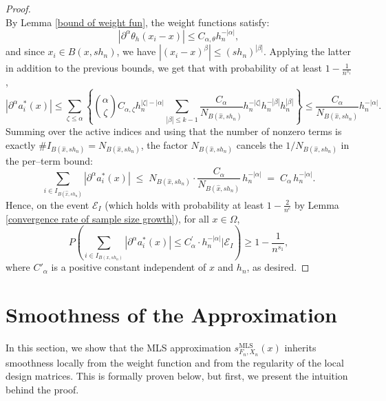 \documentclass{article}
\newcommand{\mlsfunstoch}{s^\text{MLS}_{F_n,X_n}}
\begin{document}
\begin{proof}
\begin{equation*}
\end{equation*}
By Lemma \ref{bound of weight fun}, the weight functions satisfy:
$$
\left|\partial^\alpha \theta_{h}(x_i-x)\right| \leq C_{\alpha,\theta} h_n^{-|\alpha|},
$$
and since  $x_i \in B\left(x, s h_n\right)$, we have $\left|\left(x_i-x\right)^\beta\right| \leq\left(s h_n\right)^{|\beta|}$. Applying the latter in addition to the previous bounds, we get that with probability of at least $1-\frac{1}{n^{s_1 }}$,
\begin{equation*}
    \left|\partial^\alpha a_i^*(x)\right|  \leqslant \sum_{\zeta \leqslant \alpha}\left\{\binom{\alpha}{\zeta} C_{\alpha, \zeta} h_n^{|\zeta|-|\alpha|} \sum_{|\beta| \leqslant k-1} \frac{C_\alpha}{N_{B(\hat{x}, s h_n)}} h_n^{-|\zeta|} h_n^{-|\beta|} h_n^{|\beta|}\right\} \leqslant \frac{C_\alpha}{N_{B(\hat{x}, s h_n)}} h_n^{-|\alpha|}.
\end{equation*}
Summing over the active indices and using that the number of nonzero terms is exactly $\#I_{B(\hat{x}, s h_n)}=N_{B(\hat{x}, s h_n)}$, the factor $N_{B(\hat{x}, s h_n)}$ cancels the $1/N_{B(\hat{x}, s h_n)}$ in the per--term bound:
$$
\sum_{i \in I_{B(\hat{x}, s h_n)}}\left|\partial^\alpha a_i^*(x)\right|
\;\leq\; N_{B(\hat{x}, s h_n)}\cdot \frac{C_\alpha}{N_{B(\hat{x}, s h_n)}}\, h_n^{-|\alpha|}
\;=\; C_\alpha\, h_n^{-|\alpha|}.
$$
Hence, on the event $\mathscr{E}_I$ (which holds with probability at least $1-\tfrac{2}{n^c}$ by Lemma \ref{convergence rate of sample size growth}), for all $x\in\Omega$,
\begin{equation}
    P\left(\sum_{i \in I_{B\left(x, s h_n\right)}}\left|\partial^\alpha a_i^*(x)\right| \leq C_\alpha^{\prime} \cdot h_n^{-|\alpha|} \Big|\mathscr{E}_I\right)\geq 1-\frac{1}{n^{s_1 }},
    \label{eq: point-wise lemma 9}
\end{equation}
 where $C'_\alpha$ is a positive constant independent of $x$ and $h_n$, as desired.
 \end{proof}

\section{Smoothness of the Approximation} \label{smoothness of the approximation}

In this section, we show that the MLS approximation $\mlsfunstoch(x)$ inherits smoothness locally from the weight function and from the regularity of the local design matrices. This is formally proven below, but first, we present the intuition behind the proof.
\end{document}
